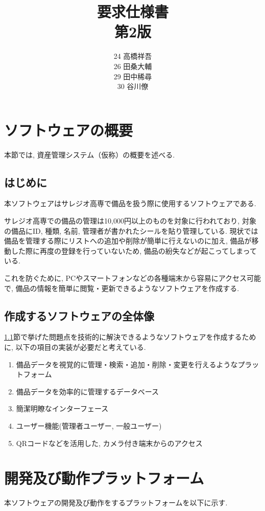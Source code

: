 \documentclass[11ptm]{jsarticle}
\title{{\Huge 要求仕様書}\\第2版}
\author{24 高橋祥吾\\26 田桑大輔\\29 田中稀尋\\30 谷川僚}
\date{}
\begin{document}
\maketitle
\clearpage

\tableofcontents
\clearpage

\section{ソフトウェアの概要}
\label{sec:ソフトウェアの概要}
本節では, 資産管理システム（仮称）の概要を述べる. 

\subsection{はじめに}
\label{subsec:はじめに}
本ソフトウェアはサレジオ高専で備品を扱う際に使用するソフトウェアである. \par
サレジオ高専での備品の管理は10,000円以上のものを対象に行われており, 対象の備品にID, 種類, 名前, 管理者が書かれたシールを貼り管理している. 現状では備品を管理する際にリストへの追加や削除が簡単に行えないのに加え, 備品が移動した際に再度の登録を行っていないため, 備品の紛失などが起こってしまっている.\par
これを防ぐために, PCやスマートフォンなどの各種端末から容易にアクセス可能で, 備品の情報を簡単に閲覧・更新できるようなソフトウェアを作成する.

\subsection{作成するソフトウェアの全体像}
\label{subsec:作成するソフトウェアの全体像}
\ref{subsec:はじめに}節で挙げた問題点を技術的に解決できるようなソフトウェアを作成するために, 以下の項目の実装が必要だと考えている.
\begin{enumerate}
  \item 備品データを視覚的に管理・検索・追加・削除・変更を行えるようなプラットフォーム
  \item 備品データを効率的に管理するデータベース
  \item 簡潔明瞭なインターフェース
  \item ユーザー機能(管理者ユーザー, 一般ユーザー)
  \item QRコードなどを活用した, カメラ付き端末からのアクセス
\end{enumerate}


\newpage
\section{開発及び動作プラットフォーム}
\label{sec:開発及び動作プラットフォーム}
本ソフトウェアの開発及び動作をするプラットフォームを以下に示す. 
\end{document}
